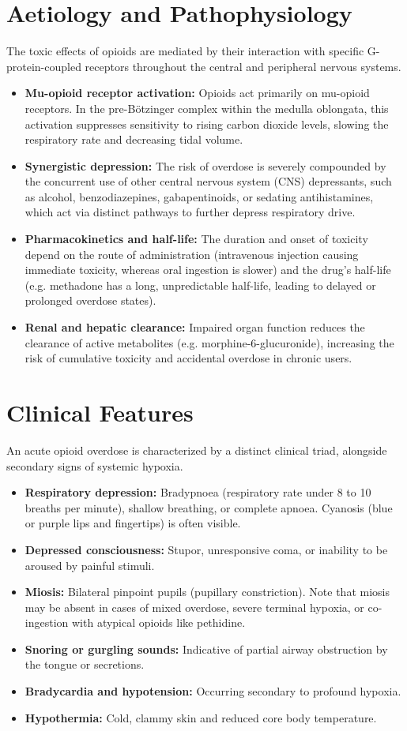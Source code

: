 \section*{Aetiology and Pathophysiology}
The toxic effects of opioids are mediated by their interaction with specific G-protein-coupled receptors throughout the central and peripheral nervous systems.
\begin{itemize}
    \item \textbf{Mu-opioid receptor activation:} Opioids act primarily on mu-opioid receptors. In the pre-Bötzinger complex within the medulla oblongata, this activation suppresses sensitivity to rising carbon dioxide levels, slowing the respiratory rate and decreasing tidal volume.
    \item \textbf{Synergistic depression:} The risk of overdose is severely compounded by the concurrent use of other central nervous system (CNS) depressants, such as alcohol, benzodiazepines, gabapentinoids, or sedating antihistamines, which act via distinct pathways to further depress respiratory drive.
    \item \textbf{Pharmacokinetics and half-life:} The duration and onset of toxicity depend on the route of administration (intravenous injection causing immediate toxicity, whereas oral ingestion is slower) and the drug's half-life (e.g. methadone has a long, unpredictable half-life, leading to delayed or prolonged overdose states).
    \item \textbf{Renal and hepatic clearance:} Impaired organ function reduces the clearance of active metabolites (e.g. morphine-6-glucuronide), increasing the risk of cumulative toxicity and accidental overdose in chronic users.
\end{itemize}

\section*{Clinical Features}
An acute opioid overdose is characterized by a distinct clinical triad, alongside secondary signs of systemic hypoxia.
\begin{itemize}
    \item \textbf{Respiratory depression:} Bradypnoea (respiratory rate under 8 to 10 breaths per minute), shallow breathing, or complete apnoea. Cyanosis (blue or purple lips and fingertips) is often visible.
    \item \textbf{Depressed consciousness:} Stupor, unresponsive coma, or inability to be aroused by painful stimuli.
    \item \textbf{Miosis:} Bilateral pinpoint pupils (pupillary constriction). Note that miosis may be absent in cases of mixed overdose, severe terminal hypoxia, or co-ingestion with atypical opioids like pethidine.
    \item \textbf{Snoring or gurgling sounds:} Indicative of partial airway obstruction by the tongue or secretions.
    \item \textbf{Bradycardia and hypotension:} Occurring secondary to profound hypoxia.
    \item \textbf{Hypothermia:} Cold, clammy skin and reduced core body temperature.
\end{itemize}

